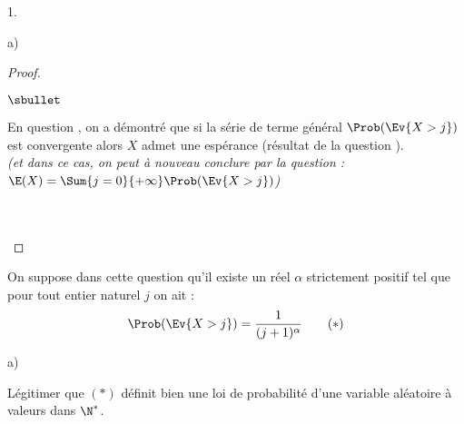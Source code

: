 \documentclass[11pt]{article}%
\begin{document}
\begin{noliste}{1.}
\begin{noliste}{a)}
\begin{proof}
\begin{noliste}{$\sbullet$}
      \item En question , on a démontré que si la série de
        terme général $\Prob(\Ev{X > j})$ est convergente alors $X$
        admet une espérance (résultat de la question ).\\
        {\it (et dans ce cas, on peut à nouveau conclure par la
          question  : $\E(X) = \Sum{j=0}{+\infty}
          \Prob(\Ev{X > j})$)}
      \end{noliste}~\\[-1.2cm]
      ~\\[-.8cm]
    \end{proof}
  \end{noliste}

\item On suppose dans cette question qu'il existe un réel $\alpha$
  strictement positif tel que pour tout entier naturel $j$ on ait :
  \[
  \Prob(\Ev{X >j})= \dfrac{1}{(j+1)^{\alpha}} \qquad (\ast)
  \]
  \begin{noliste}{a)}
  \item Légitimer que $(\ast)$ définit bien une loi de probabilité d'une 
    variable aléatoire à valeurs dans $\N^*$.
    

\end{noliste}
\end{noliste}
\end{document}
